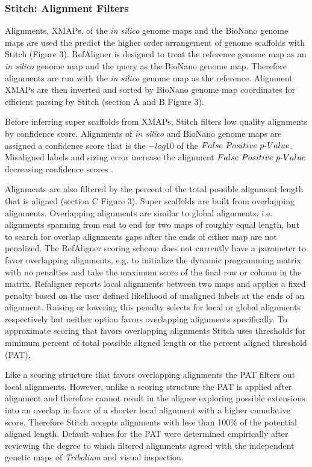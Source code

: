 \documentclass{bmcart}
\begin{document}
\subsubsection*{Stitch: Alignment Filters}

Alignments, XMAPs, of the \textit{in silico} genome maps and the BioNano genome maps are used the predict the higher order arrangement of genome scaffolds with Stitch (Figure 3). RefAligner is designed to treat the reference genome map as an \textit{in silico} genome map and the query as the BioNano genome map. Therefore alignments are run with the \textit{in silico} genome map as the reference. Alignment XMAPs are then inverted and sorted by BioNano genome map coordinates for efficient parsing by Stitch (section A and B Figure 3). 

Before inferring super scaffolds from XMAPs, Stitch filters low quality alignments by confidence score. Alignments of \textit{in silico} and BioNano genome maps are assigned a confidence score that is the $-log10$ of the $False\textnormal{ }Positive\textnormal{ }p\textnormal{-}Value$. Misaligned labels and sizing error increase the alignment $False\textnormal{ }Positive\textnormal{ }p\textnormal{-}Value$ decreasing confidence scores \cite{ProbFP} .

Alignments are also filtered by the percent of the total possible alignment length that is aligned (section C Figure 3). Super scaffolds are built from overlapping alignments. Overlapping alignments are similar to global alignments, i.e. alignments spanning from end to end for two maps of roughly equal length, but to search for overlap alignments gaps after the ends of either map are not penalized. The RefAligner scoring scheme does not currently have a parameter to favor overlapping alignments, e.g. to initialize the dynamic programming matrix with no penalties and take the maximum score of the final row or column in the matrix. Refaligner reports local alignments between two maps and applies a fixed penalty based on the user defined likelihood of unaligned labels at the ends of an alignment. Raising or lowering this penalty selects for local or global alignments respectively but neither option favors overlapping alignments specifically. To approximate scoring that favors overlapping alignments Stitch uses thresholds for minimum percent of total possible aligned length or the percent aligned threshold (PAT). 

Like a scoring structure that favors overlapping alignments the PAT filters out local alignments. However, unlike a scoring structure the PAT is applied after alignment and therefore cannot result in the aligner exploring possible extensions into an overlap in favor of a shorter local alignment with a higher cumulative score. Therefore Stitch accepts alignments with less than 100\% of the potential aligned length. Default values for the PAT were determined empirically after reviewing the degree to which filtered alignments agreed with the independent genetic maps of \textit{Tribolium} and visual inspection.
\end{document}
